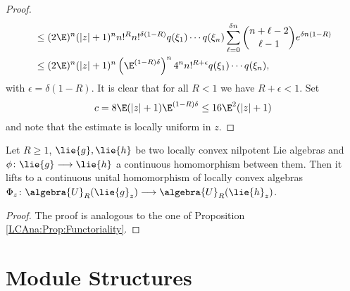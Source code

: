 \begin{proof}
\begin{align*}
        & \leq
        (2 \E)^n (|z| + 1)^n
        n!^R n!^{\delta (1 - R)}
        q(\xi_1) \cdots q(\xi_n)
        \sum\limits_{\ell = 0}^{\delta n}
        \binom{n + \ell - 2}{\ell - 1}
        e^{\delta n (1 - R)}
        \\
        & \leq
        (2 \E)^n (|z| + 1)^n
        \left(\E^{(1-R) \delta}\right)^n
        4^n n!^{R + \epsilon}
        q(\xi_1) \cdots q(\xi_n),
    \end{align*}
    with $\epsilon = \delta (1-R)$. It is clear that for all $R < 1$ we have
    $R + \epsilon < 1$. Set 
    \begin{equation*}
    	c 
    	= 
    	8 \E (|z|+1) \E^{(1-R)\delta}
    	\leq
    	16 \E^2 (|z|+1)
	\end{equation*}
	and note that the estimate is locally uniform in $z$.
\end{proof}
\begin{proposition}
	\label{Nilpot:Prop:Functoriality}
	Let $R \geq 1$, $\lie{g}, \lie{h}$ be two locally convex nilpotent Lie 
	algebras and $\phi \colon \lie{g} \longrightarrow \lie{h}$ a continuous 
	homomorphism between them. Then it lifts to a continuous unital 
	homomorphism of locally convex algebras $\Phi_z \colon 
	\algebra{U}_R(\lie{g}_z) \longrightarrow \algebra{U}_R(\lie{h}_z)$.
\end{proposition}
\begin{proof}
	The proof is analogous to the one of Proposition 
	\ref{LCAna:Prop:Functoriality}.
\end{proof}



\section{Module Structures}
\label{sec:chap6_Modules}

